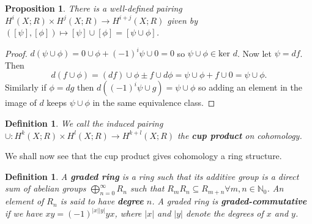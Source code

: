 \documentclass{article}
\newtheorem{definition}[theorem]{Definition}
\newtheorem{proposition}[theorem]{Proposition}
\begin{document}
\begin{proposition}
There is a well-defined pairing $H^i(X;R)\times H^j(X;R)\to H^{i+j}(X;R)$ given by $([\psi],[\phi])\mapsto [\psi]\cup [\phi]=[\psi\cup\phi]$.
\end{proposition}
\begin{proof}
$d(\psi\cup\phi)=0\cup\phi+(-1)^i\psi\cup 0=0$ so $\psi\cup\phi \in \text{ker }d$.
Now let $\psi=df$. Then \[d(f\cup\phi)=(df)\cup\phi\pm f\cup d\phi=\psi\cup\phi+f\cup0=\psi\cup\phi.\] Similarly if $\phi=dg$ then $d((-1)^i\psi\cup g)=\psi\cup\phi$ so adding an element in the image of $d$ keeps $\psi\cup\phi$ in the same equivalence class.
\end{proof}

\begin{definition}
We call the induced pairing $\cup:H^k(X;R)\times H^l(X;R)\to H^{k+l}(X;R)$ the \textbf{cup product} on cohomology.
\end{definition}
\noindent We shall now see that the cup product gives cohomology a ring structure.
\begin{definition}
A \textbf{graded ring} is a ring such that its additive group is a direct sum of abelian groups $\bigoplus_{n=0}^\infty R_n$ such that $R_mR_n\subseteq R_{m+n}\forall m,n\in\mathbb{N}_0$. An element of $R_n$ is said to have \textbf{degree} $n$. A graded ring is \textbf{graded-commutative} if we have $xy=(-1)^{|x||y|}yx$, where $|x|$ and $|y|$ denote the degrees of $x$ and $y$.
\end{definition}
\end{document}
